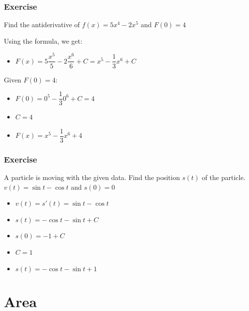 \documentclass[t]{beamer}
\theoremstyle{plain}
\theoremstyle{definition}
\begin{document}
\begin{frame}

\frametitle{Exercise}

Find the antiderivative of $f(x) = 5x^4 - 2x^5$ and $F(0) = 4$

\medskip

Using the formula, we get:
\begin{itemize}
	\item $F(x) = 5\dfrac{x^5}{5} - 2\dfrac{x^6}{6} + C = x^5 - \dfrac{1}{3}x^6 + C$
\end{itemize}

Given $F(0) = 4$:

\begin{itemize}
	\item $F(0) = 0^5 - \dfrac{1}{3}0^6 + C = 4$
	\item $C = 4$
	\item $F(x) = x^5 - \dfrac{1}{3}x^6 + 4$
\end{itemize}

\end{frame}


\begin{frame}

\frametitle{Exercise}

A particle is moving with the given data.  Find the position $s(t)$ of the particle.  $v(t) = \sin{t} - \cos{t}$ and $s(0) = 0$

\medskip

\begin{itemize}
	\item $v(t) = s'(t) = \sin{t} - \cos{t}$
	\item $s(t) = -\cos{t} - \sin{t} + C$
	\item $s(0) = -1 +C$
	\item $C = 1$
	\item $s(t) = -\cos{t} - \sin{t} + 1$
\end{itemize}

\end{frame}


\section{Area}
\end{document}
